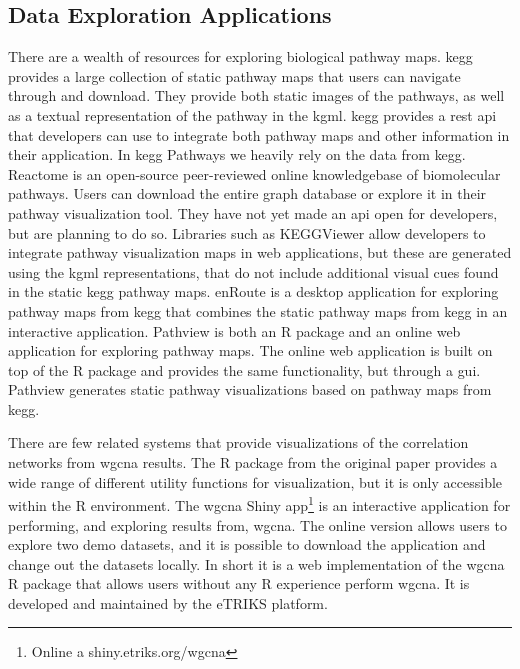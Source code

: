 \subsection{Data Exploration Applications} 
There are a wealth of resources for exploring biological pathway maps.
\gls{kegg} provides a large collection of static pathway maps that users
can navigate through and download.\cite{kegg} They provide both static images of
the pathways, as well as a textual representation of the pathway in the
\gls{kgml}.  \gls{kegg} provides a \gls{rest} \gls{api} that developers can use
to integrate both pathway maps and other information in their application. In
\gls{kegg} Pathways we heavily rely on the data from \gls{kegg}.  Reactome is an
open-source peer-reviewed online knowledgebase of biomolecular
pathways.\cite{fabregat2018reactome} Users can download the entire graph
database or explore it in their pathway visualization tool. They have not yet
made an \gls{api} open for developers, but are planning to do so. Libraries such
as KEGGViewer\cite{villaveces2014keggviewer} allow developers to integrate
pathway visualization maps in web applications, but these are generated using
the \gls{kgml} representations, that do not include additional visual cues found
in the static \gls{kegg} pathway maps.  enRoute\cite{partl2012enroute} is a
desktop application for exploring pathway maps from \gls{kegg} that combines the
static pathway maps from \gls{kegg} in an interactive application. Pathview is
both an R package and an online web application for exploring pathway
maps.\cite{luo2017pathview} The online web application is built on top of the R
package and provides the same functionality, but through a \gls{gui}. Pathview
generates static pathway visualizations based on pathway maps from \gls{kegg}. 

There are few related systems that provide visualizations of the correlation
networks from \gls{wgcna}
results. The R package from the original paper provides a wide range of
different utility functions for visualization, but it is only accessible within
the R environment.  The \gls{wgcna} Shiny app\footnote{Online a
shiny.etriks.org/wgcna} is an interactive application for performing, and
exploring results from, \gls{wgcna}.  The online version allows users to explore
two demo datasets, and it is possible to download the application and change out
the datasets locally. In short it is a web implementation of the \gls{wgcna} R
package that allows users without any R experience perform \gls{wgcna}. It is
developed and maintained by the eTRIKS platform.\cite{bussery2018etriks}

